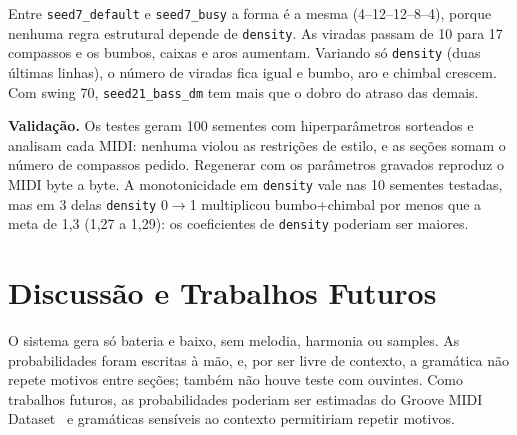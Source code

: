 \documentclass{article}
\newcommand{\tm}[1]{\texttt{#1}}
\begin{document}
Entre \tm{seed7\_default} e \tm{seed7\_busy} a forma é a mesma (4--12--12--8--4), porque nenhuma regra
estrutural depende de \tm{density}. As viradas passam de 10 para 17 compassos e os bumbos, caixas e
aros aumentam. Variando só \tm{density} (duas últimas linhas), o número de viradas fica igual e
bumbo, aro e chimbal crescem. Com swing 70,
\tm{seed21\_bass\_dm} tem mais que o dobro do atraso das demais.



\textbf{Validação.} Os testes geram 100 sementes com hiperparâmetros sorteados e analisam cada MIDI:
nenhuma violou as restrições de estilo, e as seções somam o número de compassos pedido. Regenerar com os
parâmetros gravados reproduz o MIDI byte a byte. A monotonicidade em \tm{density} vale nas 10 sementes testadas, mas em 3 delas \tm{density} 0$\to$1 multiplicou bumbo+chimbal por menos que a meta
de 1,3 (1,27 a 1,29): os coeficientes de \tm{density} poderiam ser maiores.

\section{Discussão e Trabalhos Futuros}\label{sec:discussion}

O sistema gera só bateria e baixo, sem melodia, harmonia ou samples. As probabilidades foram escritas à
mão, e, por ser livre de contexto, a gramática não repete motivos entre seções; também não houve teste
com ouvintes. Como trabalhos futuros, as probabilidades poderiam ser estimadas do Groove MIDI Dataset~\cite{Gillick19} e
gramáticas sensíveis ao contexto permitiriam repetir motivos.


\end{document}
